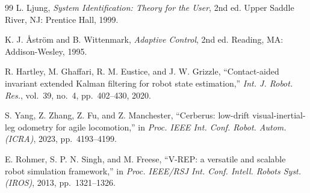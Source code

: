 \documentclass[a4paper, 10pt, conference]{ieeeconf}
\begin{document}
\begin{thebibliography}{99}
 L. Ljung, \emph{System Identification: Theory for the User},
2nd ed. Upper Saddle River, NJ: Prentice Hall, 1999.

 K. J. \r{A}str\"om and B. Wittenmark, \emph{Adaptive
Control}, 2nd ed. Reading, MA: Addison-Wesley, 1995.

 R. Hartley, M. Ghaffari, R. M. Eustice, and J. W. Grizzle,
``Contact-aided invariant extended Kalman filtering for robot state estimation,''
\emph{Int. J. Robot. Res.}, vol.~39, no.~4, pp.~402--430, 2020.

 S. Yang, Z. Zhang, Z. Fu, and Z. Manchester, ``Cerberus:
low-drift visual-inertial-leg odometry for agile locomotion,'' in \emph{Proc. IEEE
Int. Conf. Robot. Autom. (ICRA)}, 2023, pp.~4193--4199.

 E. Rohmer, S. P. N. Singh, and M. Freese, ``V-REP: a
versatile and scalable robot simulation framework,'' in \emph{Proc. IEEE/RSJ Int.
Conf. Intell. Robots Syst. (IROS)}, 2013, pp.~1321--1326.

\end{thebibliography}
\end{document}
